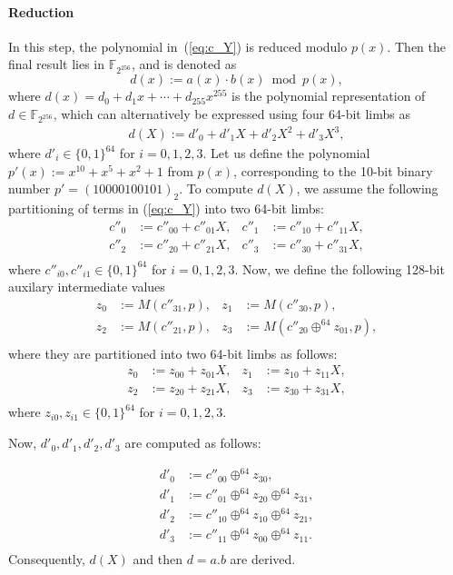 \paragraph{Reduction}
In this step, the polynomial in~(\ref{eq:c_Y}) is reduced modulo \( p(x) \). Then the final result lies in \( \mathbb{F}_{2^{256}} \), and is denoted as
	\[
	d(x) := a(x) \cdot b(x) \bmod p(x),
	\]
where \( d(x) = d_0 + d_1x + \cdots + d_{255}x^{255} \) is the polynomial representation of \( d \in \mathbb{F}_{2^{256}} \), which can alternatively be expressed using four 64-bit limbs as	
\begin{align}
	d(X) := d'_0 + d'_1X + d'_2X^2 + d'_3X^3,
\end{align}
where \( d'_i \in \{0,1\}^{64} \) for \( i = 0,1,2,3 \).
Let us define the polynomial \( p'(x) := x^{10} + x^{5} + x^{2} + 1 \) from $p(x)$, corresponding to the 10-bit binary number \( p' = (10000100101)_2 \).
To compute \( d(X) \), we assume the following partitioning of terms in (\ref{eq:c_Y}) into two 64-bit limbs:
 \begin{align*}
 	c''_0 &:= c''_{00} + c''_{01}X,& c''_1 &:= c''_{10} + c''_{11}X,\\
	c''_2 &:= c''_{20} + c''_{21}X,& c''_3 &:= c''_{30} + c''_{31}X,\\
\end{align*}	
where $c''_{i0}, c''_{i1} \in \{0,1\}^{64}$ for $i=0,1,2,3$. Now, we define the following 128-bit auxilary intermediate values
\begin{align*}
	z_0 &:= M(c''_{31},p), &	z_1 &:= M(c''_{30},p), \\
	z_2 &:= M(c''_{21},p), &	z_3 &:= M(c''_{20} \oplus^{64} z_{01} ,p), \\
\end{align*}
where they are partitioned  into two 64-bit limbs as follows:
 \begin{align*}
	z_0 &:= z_{00} + z_{01}X,& z_1 &:= z_{10} + z_{11}X,\\
	z_2 &:= z_{20} + z_{21}X,& z_3 &:= z_{30} + z_{31}X,\\
\end{align*}	
where $z_{i0}, z_{i1} \in \{0,1\}^{64}$ for $i=0,1,2,3$.
 
 
Now, $d'_0, d'_1, d'_2, d'_3$ are computed as follows:

 \begin{align*}
	d'_0 &:= c''_{00} \oplus^{64} z_{30},\\
	d'_1 &:= c''_{01} \oplus^{64} z_{20} \oplus^{64} z_{31},\\
	d'_2 &:= c''_{10} \oplus^{64} z_{10} \oplus^{64} z_{21},\\
	d'_3 &:= c''_{11} \oplus^{64} z_{00} \oplus^{64} z_{11}.\\
\end{align*}
Consequently, $d(X)$ and then $d=a.b$ are derived.